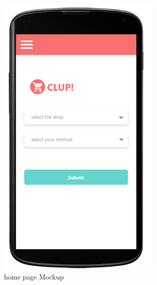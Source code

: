 \begin{figure}[H]
  \centering
  \includegraphics[width=0.7\textwidth,keepaspectratio]{images/9.png}
  \caption{home page Mockup}
\end{figure}
